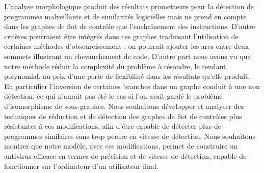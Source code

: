 L'analyse morphologique produit des résultats prometteurs pour la détection de programmes malveillants et de similarités logicielles mais ne prend en compte dans les graphes de flot de contrôle que l'enchaînement des instructions. D'autre critères pourraient être intégrés dans ces graphes traduisant l'utilisation de certaines méthodes d'obscurcissement : on pourrait ajouter les arcs entre deux sommets illustrant un chevauchement de code.
D'autre part nous avons vu que notre méthode réduit la complexité du problème à résoudre, le rendant polynomial, au prix d'une perte de flexibilité dans les résultats qu'elle produit. 
En particulier l'inversion de certaines branches  dans un graphe conduit à une non détection, ce qui n'aurait pas été le cas si l'on avait gardé le problème d'isomorphisme de sous-graphes.
Nous souhaitons développer et analyser des techniques de réduction et de détection des graphes de flot de contrôles plus résistantes à ces modifications, afin d'être capable de détecter plus de programmes similaires sans trop perdre en vitesse de détection.
Nous souhaitons montrer que notre modèle, avec ces modifications, permet de construire un antivirus efficace en termes de précision et de vitesse de détection, capable de fonctionner sur l'ordinateur d'un utilisateur final.


